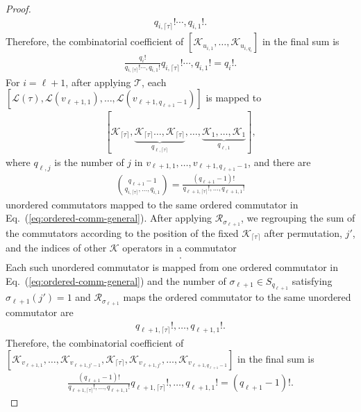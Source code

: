 \documentclass[11pt]{article}
\newcommand{\eq}[1]{(\ref{eq:#1})}
\newcommand{\mc}{\mathcal}
\begin{document}
\begin{proof}
\begin{align*}
    q_{i, \lceil\tau\rceil}! \cdots, q_{i,1}!.
\end{align*}
Therefore, the combinatorial coefficient of $[\mc K_{u_{i,1}},\ldots, \mc K_{u_{i,q_i}}]$ in the final sum is 
\begin{align*}
    \frac{q_i!}{q_{i, \lceil\tau\rceil}! \cdots, q_{i,1}!}q_{i, \lceil\tau\rceil}! \cdots, q_{i,1}! = q_i!.
\end{align*}
For $i= \ell+1$, after applying $\mc T$, each $[\mc L(\tau), \mc L(v_{\ell+1,1}), \ldots, \mc L(v_{\ell+1,q_{\ell+1}-1})]$ is mapped to
\begin{align}
\label{eq:ordered-comm-general}
    [\mc K_{\lceil \tau \rceil},\underbrace{\mc K_{\lceil\tau\rceil} \ldots,\mc K_{\lceil\tau\rceil}}_{q_{\ell,\lceil\tau\rceil}},  \ldots, \underbrace{\mc K_{1},  \ldots, \mc K_{1}}_{q_{\ell,1}}],
\end{align}
where $q_{\ell,j}$ is the number of $j$ in $v_{\ell+1, 1},\ldots, v_{\ell+1, q_{\ell+1}-1}$, and there are
\begin{align*}
    \binom{q_{\ell+1}-1}{q_{i,\lceil \tau \rceil}, \ldots, q_{i,1}} = \frac{(q_{\ell+1}-1)!}{q_{\ell+1,\lceil \tau \rceil}!, \ldots, q_{\ell+1,1}!}
\end{align*} unordered commutators mapped to the same ordered commutator in Eq.~\eq{ordered-comm-general}. After applying $\mc R_{\sigma_{\ell+1}}$, we regrouping the sum of the commutators according to the position of the fixed $\mc K_{\lceil \tau \rceil}$ after permutation, $j'$, and the indices of other $\mc K$ operators in a commutator
\begin{align*}
    [\mc K_{v_{\ell+1,1}}, \ldots,\mc K_{\lceil\tau\rceil}, \ldots, \mc K_{v_{\ell+1,q_{\ell+1}-1}}].
\end{align*}
Each such unordered commutator is mapped from one ordered commutator in Eq.~\eq{ordered-comm-general} and the number of $\sigma_{\ell+1}\in S_{q_{\ell+1}}$ satisfying $\sigma_{\ell+1}(j')=1$ and $\mc R_{\sigma_{\ell+1}}$ maps the ordered commutator to the same unordered commutator are
\begin{align*}
    q_{\ell+1,\lceil \tau \rceil}!, \ldots, q_{\ell+1,1}!.
\end{align*}
Therefore, the combinatorial coefficient of $[\mc K_{v_{\ell+1,1}}, \ldots, \mc K_{v_{\ell+1,j'-1}},\mc K_{\lceil\tau\rceil},\mc K_{v_{\ell+1,j'}}, \ldots, \mc K_{v_{\ell+1,q_{\ell+1}-1}}]$ in the final sum is
\begin{align*}
    \frac{(q_{\ell+1}-1)!}{q_{\ell+1,\lceil \tau \rceil}!, \ldots, q_{\ell+1,1}!}q_{\ell+1,\lceil \tau \rceil}!, \ldots, q_{\ell+1,1}! = (q_{\ell+1}-1)!.

\end{align*}
\end{proof}
\end{document}
